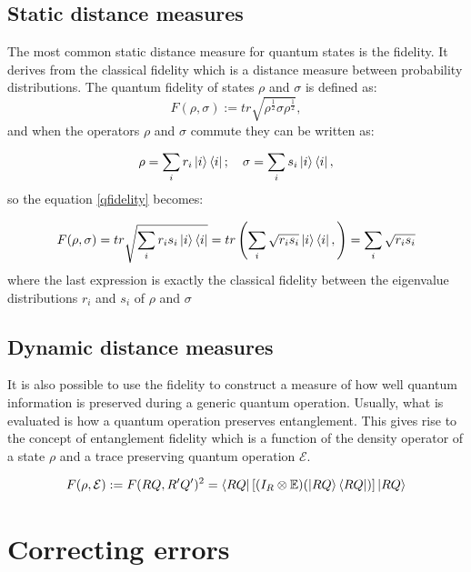 \documentclass{article}
\begin{document}
\subsection{Static distance measures}


The most common static distance measure for quantum states is the fidelity.
It derives from the classical fidelity which is a distance measure between
probability distributions.
The quantum fidelity of states $\rho$ and $\sigma$ is defined as:
\begin{equation}
	F(\rho,\sigma):=tr \sqrt{\rho^\frac{1}{2}\sigma\rho^\frac{1}{2}},
	\label{qfidelity}
\end{equation}
and when the operators $\rho$ and $\sigma$ commute they can be written as:

\begin {equation}
\rho = \sum_{i} r_i\ket{i}\bra{i}; \hspace{10pt} \sigma = \sum_{i} s_i \ket{i}\bra{i},
\end {equation}
so the equation \ref{qfidelity} becomes:

\begin{equation}
	F(\rho,\sigma) = tr \sqrt{\sum_{i} r_i s_i \ket{i}\bra{i} } = tr \left( \sum_{i} \sqrt{r_i s_i} \ket{i}\bra{i},
	\right) = \sum_{i}\sqrt{r_i s_i}
\end{equation}
where the last expression is exactly the classical fidelity between the eigenvalue
distributions $r_i$ and $s_i$ of $\rho$ and $\sigma$

\subsection{Dynamic distance measures}

It is also possible to use the fidelity to construct a measure of how
well quantum information is preserved during a generic quantum operation.
Usually, what is evaluated is how a quantum operation preserves
entanglement.
This gives rise to the concept of entanglement fidelity which is a function
of the density operator of a state $\rho$ and a trace preserving quantum operation
$\mathcal{E}$.

\begin{equation}
	F(\rho,\mathcal{E}) := F(RQ,R'Q')^2 = \bra{RQ} \left[ (I_R \otimes \mathbb{E})(\ket{RQ}\bra{RQ}) \right] \ket{RQ}
\end{equation}



\section{Correcting errors}
\end{document}
